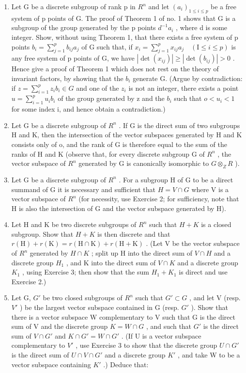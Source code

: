 \ExerciseSection

\begin{enumerate}
\def\labelenumi{\arabic{enumi})}
\item
  Let G be a discrete subgroup of rank p in \(R^{n}\) and let \((a_{i})_{1\leqslant i\leqslant p}\) be a free system of p points of G. The proof of Theorem 1 of no. 1 shows that G is a subgroup of the group generated by the p points \(d^{-1}a_{i}\) , where d is some integer. Show, without using Theorem 1, that there exists a free system of p points \(b_{i}=\sum_{j=1}^{p}b_{ij}a_{j}\) of G such that, if \(x_{i}=\sum_{j=1}^{p}x_{ij}a_{j}\quad(\mathrm{I}\leqslant i\leqslant p)\) is any free system of p points of G, we have \(|\det(x_{ij})|\geqslant|\det(b_{ij})|>0\) . Hence give a proof of Theorem 1 which does not rest on the theory of invariant factors, by showing that the \(b_{i}\) generate G. (Argue by contradiction: if \(z=\sum_{i=1}^{p}z_{i}b_{i}\in G\) and one of the \(z_{i}\) is not an integer, there exists a point \(u=\sum_{i=1}^{p}u_{i}b_{i}\) of the group generated by z and the \(b_{i}\) such that \(o<u_{i}<1\) for some index i, and hence obtain a contradiction.)
\item
  Let G be a discrete subgroup of \(R^{n}\) . If G is the direct sum of two subgroups H and K, then the intersection of the vector subspaces generated by H and K consists only of o, and the rank of G is therefore equal to the sum of the ranks of H and K (observe that, for every discrete subgroup G of \(R^{n}\) , the vector subspace of \(R^{n}\) generated by G is canonically isomorphic to \(G \otimes_{Z} R\) ).
\item
  Let G be a discrete subgroup of \(R^{n}\) . For a subgroup H of G to be a direct summand of G it is necessary and sufficient that \(H = V \cap G\) where V is a vector subspace of \(R^{n}\) (for necessity, use Exercise 2; for sufficiency, note that H is also the intersection of G and the vector subspace generated by H).
\item
  Let H and K be two discrete subgroups of \(R^{n}\) such that \(H + K\) is a closed subgroup. Show that \(H + K\) is then discrete and that \(r(\mathrm{H}) + r(\mathrm{K}) = r(\mathrm{H} \cap \mathrm{K}) + r(\mathrm{H} + \mathrm{K})\) . (Let V be the vector subspace of \(R^{n}\) generated by \(H \cap K\) ; split up H into the direct sum of \(V \cap H\) and a discrete group \(H_{1}\) , and K into the direct sum of \(V \cap K\) and a discrete group \(K_{1}\) , using Exercise 3; then show that the sum \(H_{1} + K_{1}\) is direct and use Exercise 2.)
\item
  Let G, \(G'\) be two closed subgroups of \(R^{n}\) such that \(G' \subset G\) , and let V (resp. \(V'\) ) be the largest vector subspace contained in G (resp. \(G'\) ). Show that there is a vector subspace W complementary to V such that G is the direct sum of V and the discrete group \(K = W \cap G\) , and such that \(G'\) is the direct sum of \(V \cap G'\) and \(K \cap G' = W \cap G'\) . (If U is a vector subspace complementary to \(V'\) , use Exercise 3 to show that the discrete group \(U \cap G'\) is the direct sum of \(U \cap V \cap G'\) and a discrete group \(K'\) , and take W to be a vector subspace containing \(K'\) .) Deduce that:
\end{enumerate}
